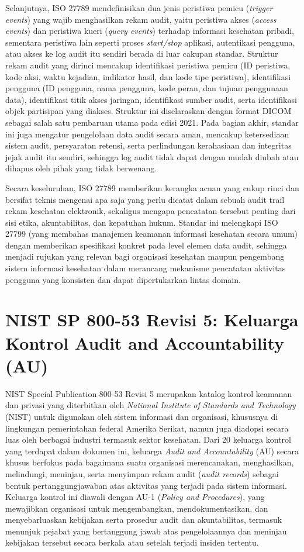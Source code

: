 Selanjutnya, ISO 27789 mendefinisikan dua jenis peristiwa pemicu (\textit{trigger events}) yang wajib menghasilkan rekam audit, yaitu peristiwa akses (\textit{access events}) dan peristiwa kueri (\textit{query events}) terhadap informasi kesehatan pribadi, sementara peristiwa lain seperti proses \textit{start/stop} aplikasi, autentikasi pengguna, atau akses ke log audit itu sendiri berada di luar cakupan standar. Struktur rekam audit yang dirinci mencakup identifikasi peristiwa pemicu (ID peristiwa, kode aksi, waktu kejadian, indikator hasil, dan kode tipe peristiwa), identifikasi pengguna (ID pengguna, nama pengguna, kode peran, dan tujuan penggunaan data), identifikasi titik akses jaringan, identifikasi sumber audit, serta identifikasi objek partisipan yang diakses. Struktur ini diselaraskan dengan format DICOM sebagai salah satu pembaruan utama pada edisi 2021. Pada bagian akhir, standar ini juga mengatur pengelolaan data audit secara aman, mencakup ketersediaan sistem audit, persyaratan retensi, serta perlindungan kerahasiaan dan integritas jejak audit itu sendiri, sehingga log audit tidak dapat dengan mudah diubah atau dihapus oleh pihak yang tidak berwenang.

Secara keseluruhan, ISO 27789 memberikan kerangka acuan yang cukup rinci dan bersifat teknis mengenai apa saja yang perlu dicatat dalam sebuah audit trail rekam kesehatan elektronik, sekaligus mengapa pencatatan tersebut penting dari sisi etika, akuntabilitas, dan kepatuhan hukum. Standar ini melengkapi ISO 27799 (yang membahas manajemen keamanan informasi kesehatan secara umum) dengan memberikan spesifikasi konkret pada level elemen data audit, sehingga menjadi rujukan yang relevan bagi organisasi kesehatan maupun pengembang sistem informasi kesehatan dalam merancang mekanisme pencatatan aktivitas pengguna yang konsisten dan dapat dipertukarkan lintas domain.

\section{NIST SP 800-53 Revisi 5: Keluarga Kontrol Audit and Accountability (AU)}
\label{sec:nist80053au}

NIST Special Publication 800-53 Revisi 5 merupakan katalog kontrol keamanan dan privasi yang diterbitkan oleh \textit{National Institute of Standards and Technology} (NIST) untuk digunakan oleh sistem informasi dan organisasi, khususnya di lingkungan pemerintahan federal Amerika Serikat, namun juga diadopsi secara luas oleh berbagai industri termasuk sektor kesehatan. Dari 20 keluarga kontrol yang terdapat dalam dokumen ini, keluarga \textit{Audit and Accountability} (AU) secara khusus berfokus pada bagaimana suatu organisasi merencanakan, menghasilkan, melindungi, meninjau, serta menyimpan rekam audit (\textit{audit records}) sebagai bentuk pertanggungjawaban atas aktivitas yang terjadi pada sistem informasi. Keluarga kontrol ini diawali dengan AU-1 (\textit{Policy and Procedures}), yang mewajibkan organisasi untuk mengembangkan, mendokumentasikan, dan menyebarluaskan kebijakan serta prosedur audit dan akuntabilitas, termasuk menunjuk pejabat yang bertanggung jawab atas pengelolaannya dan meninjau kebijakan tersebut secara berkala atau setelah terjadi insiden tertentu.

